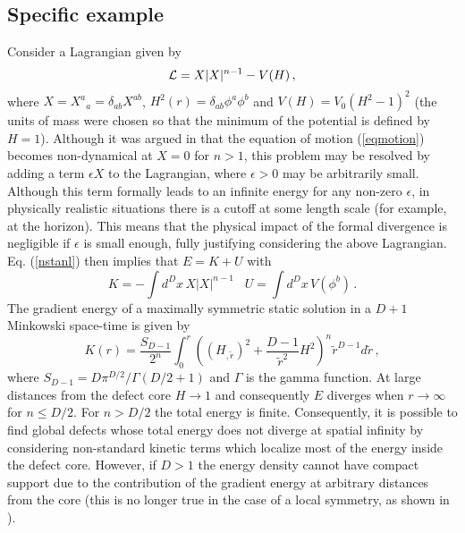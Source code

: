 \documentclass[prd,twocolumn,a4paper,superscriptaddress,floatfix]{revtex4}
\def\be{\begin{equation}}
\def\ee{\end{equation}}
\begin{document}
\subsection{Specific example}

Consider a Lagrangian given by
\be
\label{nstanl}
\LL =X|X|^{n-1} - V(H)\,,
\ee
where $X={X^a}_a=\delta_{ab}   X^{a b}$, $H^2(r)=\delta_{ab} \phi^a \phi^b$ and $V(H)=V_0(H^2-1)^2$ (the units of mass were chosen so that the minimum of the potential is defined by $H=1$). Although it was argued in \cite{Babichev:2006cy} that the equation of motion (\ref{eqmotion}) becomes non-dynamical at $X=0$ for $n>1$, this problem may be resolved by adding a term $\epsilon X$ to the Lagrangian, where $\epsilon > 0$ may be arbitrarily small. Although this term formally leads to an infinite energy for any non-zero $\epsilon$, in physically realistic situations there is a cutoff at some length scale (for example, at the horizon). This means that the physical impact of the formal divergence is negligible if $\epsilon$ is small enough, fully justifying considering the above Lagrangian. Eq. (\ref{nstanl}) then implies that $E=K+U$ with 
\be\label{EGandEV1}
K=-\int d^Dx \, X|X|^{n-1} \, \,\,\,\, U=\int d^Dx \, V(\phi^b)\,.
\ee
The gradient energy of a maximally symmetric static solution in a $D+1$ Minkowski space-time is given by 
\be
K(r)=\frac{S_{D-1}}{2^n}\int_0^r \left((H_{,{\tilde r}})^2 + \frac{D-1}{{\tilde r}^2} H^2\right)^n {\tilde r}^{D-1} d {\tilde r} \,,
\label{erho2}
\ee
where $S_{D-1}=D\pi^{D/2}/\Gamma(D/2+1)$ and $\Gamma$ is the gamma function. At large distances from the defect core $H \to 1$ and consequently $E$ diverges when $r \to \infty$ for $n \le D/2$. For $n > D/2$ the total energy is finite. Consequently, it is possible to find global defects whose total energy does not diverge at spatial infinity by considering non-standard kinetic terms which localize most of the energy inside the defect core. However, if $D>1$ the energy density cannot have compact support due to the contribution of the gradient energy at arbitrary distances from the core (this is no longer true in the case of a local symmetry, as shown in \cite{Adam:2008rf,Bazeia:2010vb}).
\end{document}
